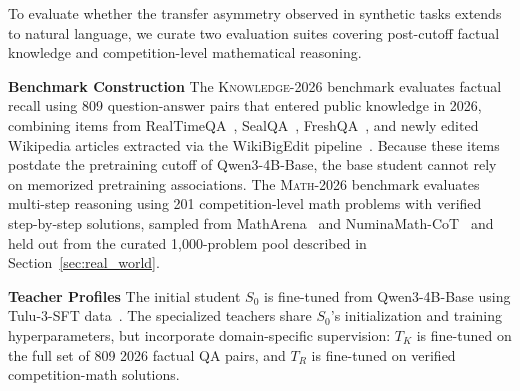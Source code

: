 \documentclass[]{template}
\providecommand{\hi}{\cellcolor{qgreen!18!white}}
\theoremstyle{plain}
\theoremstyle{definition}
\theoremstyle{remark}
\renewcommand{\paragraph}[1]{\vspace{1mm}\noindent\textbf{#1}}
\begin{document}
To evaluate whether the transfer asymmetry observed in synthetic tasks extends to natural language, we curate two evaluation suites covering post-cutoff factual knowledge and competition-level mathematical reasoning.


\paragraph{Benchmark Construction}
The \textsc{Knowledge-2026} benchmark evaluates factual recall using 809 question-answer pairs that entered public knowledge in 2026, combining items from RealTimeQA~\citep{kasai2023realtime}, SealQA~\citep{pham2026sealqa}, FreshQA~\citep{vu2024freshllms}, and newly edited Wikipedia articles extracted via the WikiBigEdit pipeline~\citep{pmlr-v267-thede25a}. Because these items postdate the pretraining cutoff of Qwen3-4B-Base, the base student cannot rely on memorized pretraining associations. The \textsc{Math-2026} benchmark evaluates multi-step reasoning using 201 competition-level math problems with verified step-by-step solutions, sampled from MathArena~\citep{balunovic2026matharena} and NuminaMath-CoT~\citep{numina_math_datasets} and held out from the curated 1,000-problem pool described in Section~\ref{sec:real_world}.

\paragraph{Teacher Profiles}
The initial student $S_0$ is fine-tuned from Qwen3-4B-Base using Tulu-3-SFT data~\citep{lambert2024tulu}. The specialized teachers share $S_0$'s initialization and training hyperparameters, but incorporate domain-specific supervision: $T_K$ is fine-tuned on the full set of 809 2026 factual QA pairs, and $T_R$ is fine-tuned on verified competition-math solutions. 

\end{document}
